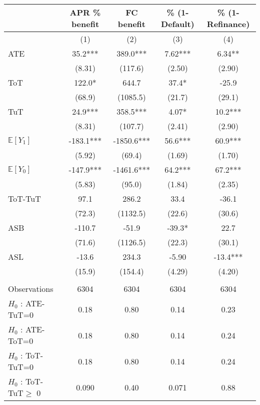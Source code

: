 \begin{tabular}{lcccc}
\toprule
      & APR \% benefit & FC benefit & \% (1-Default) & \% (1-Refinance) \\
\midrule
      & (1)   & (2)   & (3)   & (4) \\
\midrule
\midrule
ATE   & 35.2*** & 389.0*** & 7.62*** & 6.34** \\
      & (8.31) & (117.6) & (2.50) & (2.90) \\
ToT   & 122.0* & 644.7 & 37.4* & -25.9 \\
      & (68.9) & (1085.5) & (21.7) & (29.1) \\
TuT   & 24.9*** & 358.5*** & 4.07* & 10.2*** \\
      & (8.31) & (107.7) & (2.41) & (2.90) \\
$\mathbb{E}[Y_1]$ & -183.1*** & -1850.6*** & 56.6*** & 60.9*** \\
      & (5.92) & (69.4) & (1.69) & (1.70) \\
$\mathbb{E}[Y_0]$ & -147.9*** & -1461.6*** & 64.2*** & 67.2*** \\
      & (5.83) & (95.0) & (1.84) & (2.35) \\
\midrule
ToT-TuT & 97.1  & 286.2 & 33.4  & -36.1 \\
      & (72.3) & (1132.5) & (22.6) & (30.6) \\
ASB   & -110.7 & -51.9 & -39.3* & 22.7 \\
      & (71.6) & (1126.5) & (22.3) & (30.1) \\
ASL   & -13.6 & 234.3 & -5.90 & -13.4*** \\
      & (15.9) & (154.4) & (4.29) & (4.20) \\
      &       &       &       &  \\
\midrule
Observations & 6304  & 6304  & 6304  & 6304 \\
$H_0$ : ATE-TuT=0 & 0.18  & 0.80  & 0.14  & 0.23 \\
$H_0$ : ATE-ToT=0 & 0.18  & 0.80  & 0.14  & 0.24 \\
$H_0$ : ToT-TuT=0 & 0.18  & 0.80  & 0.14  & 0.24 \\
$H_0$ : ToT-TuT$\geq$ 0 & 0.090 & 0.40  & 0.071 & 0.88 \\
\bottomrule
\bottomrule
\end{tabular}%
